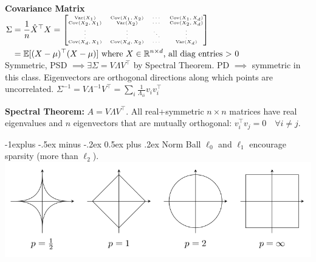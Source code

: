 \documentclass[10pt,landscape]{article}
\makeatletter
\DeclareMathOperator*{\Var}{Var}
\DeclareMathOperator*{\Cov}{Cov}
\def\E{\mathbb{E}}
\renewcommand{\subsection}{\@startsection{subsection}{2}{0mm}%
                                {-1explus -.5ex minus -.2ex}%
                                {0.5ex plus .2ex}%
                                {\normalfont\normalsize\bfseries}}
\makeatother
\begin{document}
\begin{multicols}{3}
\textbf{Covariance Matrix}
$\begin{aligned}[t]\Sigma &=\frac{1}{n}\hat{X}^{\top}X = 
{\tiny\begin{bmatrix}
\Var(X_1) & \Cov(X_1, X_2) & \cdots &  \Cov(X_1, X_d) \\
\Cov(X_2, X_1) & \Var(X_2) & \cdots & \Cov(X_2, X_d) \\
\vdots & \vdots & \ddots & \vdots \\
\Cov(X_d, X_1) & \Cov(X_d, X_2) & \cdots & \Var(X_d)
\end{bmatrix}} \\
&= \E[(X - \mu)^{\top}(X - \mu)] \text{ where } X \in \mathbb{R}^{n \times d} \text{, all diag entries $>$ 0}
\end{aligned}$
\\ \vspace{0.1cm}
 Symmetric, PSD $\implies\exists \Sigma=V\Lambda V^\top$ by Spectral Theorem.
PD $\implies$ symmetric in this class. Eigenvectors are orthogonal directions along which points are uncorrelated. $\Sigma^{-1} = V \Lambda^{-1}V^{\top} = \sum_i \frac{1}{\Lambda_{ii}}v_iv_i^{\top}$

\textbf{Spectral Theorem: }$A=V\Lambda V^\top$.
All real+symmetric $n \times n$ matrices have real eigenvalues and $n$ eigenvectors that are mutually orthogonal: $v_{i}^{\top} v_{j}=0 \quad  \forall i \neq j$.

\subsection{Norm Ball}
$\ell_0$ and $\ell_1$ encourage sparsity (more than $\ell_2$).
\includegraphics[scale=0.2]{norms.png}


\end{multicols}
\end{document}
